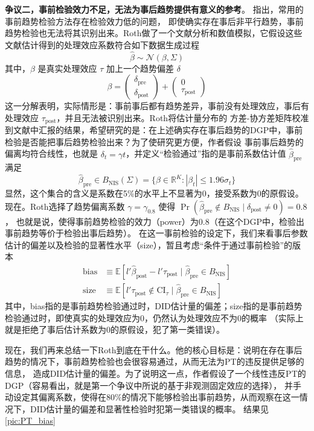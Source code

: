 \documentclass[../didNotes.tex]{subfiles}
\begin{document}
\textbf{争议二，事前检验效力不足，无法为事后趋势提供有意义的参考}。\textcite{roth2022} 指出，常用的事前趋势检验方法存在检验效力低的问题，
即使确实存在事后非平行趋势，事前趋势检验也无法将其识别出来。Roth做了一个文献分析和数值模拟，它假设这些文献估计得到的处理效应系数符合如下数据生成过程
$$
\hat{\beta} \sim \mathcal{N}(\beta, \Sigma)
$$
其中，$\beta$ 是真实处理效应 $\tau$ 加上一个趋势偏差 $\delta$
$$
\beta =
\begin{pmatrix}
  \delta_{\text{pre}} \\
  \delta_{\text{post}}
\end{pmatrix} +
\begin{pmatrix}
  0 \\
  \tau_{\text{post}}
\end{pmatrix}
$$
这一分解表明，实际情形是：事前事后都有趋势差异，事前没有处理效应，事后有处理效应 $\tau_{\text{post}}$，并且无法被识别出来。Roth将估计量分布的
方差-协方差矩阵校准到文献中汇报的结果，希望研究的是：在上述确实存在事后趋势的DGP中，事前检验是否能把事后趋势检验出来？为了使研究更方便，作者假设
事前事后趋势的偏离均符合线性，也就是 $\delta_{t} = \gamma t$，并定义``检验通过''指的是事前系数估计值 $\hat{\beta}_{\text{pre}}$ 满足
$$
\hat{\beta}_{\text{pre}} \in B_{\text{NIS}}(\Sigma) = \{ \beta \in \mathbb{R}^{K}: \left\vert \beta_{t}
\right\vert  \le 1.96 \sigma_{t} \}
$$
显然，这个集合的含义是系数在5\%的水平上不显著为0，接受系数为0的原假设。现在。Roth选择了趋势偏离系数 $\gamma = \gamma_{0.8}$ 使得
$\Pr(\hat{\beta}_{\text{pre}} \notin B_{\text{NIS}} \mid \delta_{\text{post}} \neq 0) = 0.8$，
也就是说，使得事前趋势检验的效力（power）为0.8（在这个DGP中，检验出事前趋势等价于检验出事后趋势）。
在这一事前检验的设定下，我们来看事后参数估计的偏差以及检验的显著性水平（size），暂且考虑``条件于通过事前检验''的版本
\begin{align*}
  \text{bias} &\equiv \mathbb{E}[l' \hat{\beta}_{\text{post}} - l' \tau_{\text{post}} \mid
  \hat{\beta}_{\text{pre}} \in B_{\text{NIS}}] \\
  \text{size} &\equiv \mathbb{E}[l' \tau_{\text{post}} \notin \text{CI}_{\tau} \mid \hat{\beta}_{\text{pre}}
  \in B_{\text{NIS}}]
\end{align*}
其中，bias指的是事前趋势检验通过时，DID估计量的偏差；size指的是事前趋势检验通过时，即使真实的处理效应为0，仍然认为处理效应不为0的概率
（实际上就是拒绝了事后估计系数为0的原假设，犯了第一类错误）。

现在，我们再来总结一下Roth到底在干什么。他的核心目标是：说明在存在事后趋势的情况下，事前趋势检验也会很容易通过，从而无法为PT的违反提供足够的信息，
造成DID估计量的偏差。为了说明这一点，作者假设了一个线性违反PT的DGP（容易看出，就是第一个争议中所说的基于非观测固定效应的选择），
并手动设定其偏离系数，使得在80\%的情况下能够检验出事前趋势，从而观察在这一情况下，DID估计量的偏差和显著性检验时犯第一类错误的概率。
结果见 \autoref{pic:PT_bias}
\end{document}

